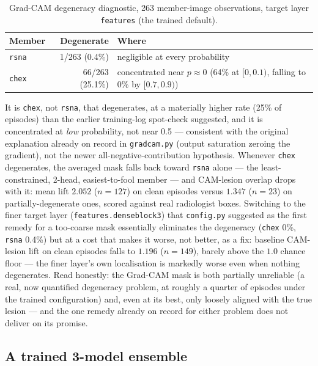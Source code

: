 \documentclass[11pt]{article}
\begin{document}
\begin{table}[h]
\centering
\caption{Grad-CAM degeneracy diagnostic, 263 member-image observations,
target layer \texttt{features} (the trained default).}
\label{tab:gradcam_degeneracy}
\begin{tabular}{@{}lrl@{}}
\toprule
Member & Degenerate & Where \\
\midrule
\texttt{rsna} & 1/263 (0.4\%) & negligible at every probability \\
\texttt{chex} & 66/263 (25.1\%) & concentrated near $p\approx0$ (64\% at
$[0,0.1)$, falling to 0\% by $[0.7,0.9)$) \\
\bottomrule
\end{tabular}
\end{table}

It is \texttt{chex}, not \texttt{rsna}, that degenerates, at a materially
higher rate (25\% of episodes) than the earlier training-log spot-check
suggested, and it is concentrated at \emph{low} probability, not near 0.5
— consistent with the original explanation already on record in
\texttt{gradcam.py} (output saturation zeroing the gradient), not the
newer all-negative-contribution hypothesis. Whenever \texttt{chex}
degenerates, the averaged mask falls back toward \texttt{rsna} alone —
the least-constrained, 2-head, easiest-to-fool member — and CAM-lesion
overlap drops with it: mean lift $2.052$ ($n=127$) on clean episodes
versus $1.347$ ($n=23$) on partially-degenerate ones, scored against real
radiologist boxes. Switching to the finer target layer
(\texttt{features.denseblock3}) that \texttt{config.py} suggested as the
first remedy for a too-coarse mask essentially eliminates the degeneracy
(\texttt{chex} 0\%, \texttt{rsna} 0.4\%) but at a cost that makes it worse,
not better, as a fix: baseline CAM-lesion lift on clean episodes falls to
$1.196$ ($n=149$), barely above the $1.0$ chance floor — the finer layer's
own localisation is markedly worse even when nothing degenerates. Read
honestly: the Grad-CAM mask is both partially unreliable (a real, now
quantified degeneracy problem, at roughly a quarter of episodes under the
trained configuration) and, even at its best, only loosely aligned with
the true lesion — and the one remedy already on record for either problem
does not deliver on its promise.

\subsection{A trained 3-model ensemble}
\label{sec:ensemble3_retrain}
\end{document}
